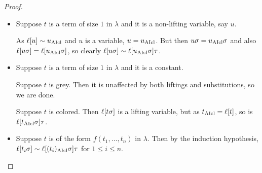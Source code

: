 \documentclass[,%
	paper=a4,%
	DIV12, %
	twoside=false,%
	liststotoc,
	bibtotoc,
	draft=false,%
	numbers=noendperiod
]{scrartcl}
\begin{document}
\begin{proof}
\begin{itemize}
\begin{comment}
				As by the induction hypothesis $t\fromclause \sim \lifboth{t}$, $t\fromclause =z_j$ for some $j$.
				Hence, $\lifboth{t\cl\sigma} = t\cl$.
				By the remark on~$\tau$,
				$\lifboth{t\sigma} \sim \lifboth{t\cl\sigma}\tau$.
			\end{comment}

		\item Suppose $t$ is a term of size $1$ in $\lambda$ and it is a non-lifting variable, say $u$.

			As $\ell[u]\sim u_{\operatorname{AIcl}}$ and $u$ is a variable, $u = u_{\operatorname{AIcl}}$.
			But then $u\sigma = u_{\operatorname{AIcl}}\sigma$ and also $\ell[u \sigma] = \ell[u_{\operatorname{AIcl}}\sigma]$, so clearly 
			$\ell[u\sigma] \sim \ell[u_{\operatorname{AIcl}}\sigma]\tau$.



		\item Suppose $t$ is a term of size $1$ in $\lambda$ and it is a constant.

			Suppose $t$ is grey. Then it is unaffected by both liftings and substitutions, so we are done.

			Suppose $t$ is colored.
			Then $\ell[t\sigma]$ is a lifting variable, but 
			as $t_{\operatorname{AIcl}} = \ell[t]$, so is $\ell[t_{\operatorname{AIcl}}\sigma]\tau$.



		\item Suppose $t$ is of the form $f(t_{1}, \dotsc, t_{n})$ in $\lambda$.
			Then by the induction hypothesis, $\ell[t_{i}\sigma] \sim \ell[(t_{i})_{\operatorname{AIcl}}\sigma]\tau$ for $1 \leq i \leq n$.
\end{itemize}
\end{proof}
\end{document}
